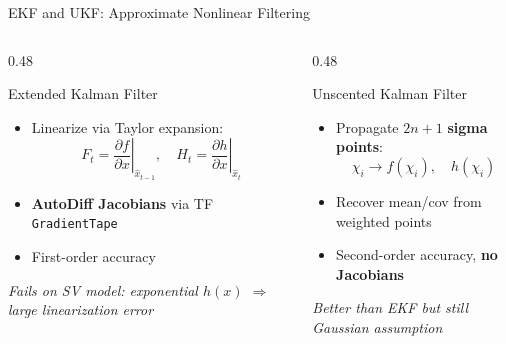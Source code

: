 \documentclass[aspectratio=169,10pt]{beamer}
\newcommand{\highlight}[1]{\textcolor{jpmlightblue}{\textbf{#1}}}
\newcommand{\remark}[1]{\textcolor{jpmaccent}{\textit{#1}}}
\begin{document}
\begin{frame}{EKF and UKF: Approximate Nonlinear Filtering}
\begin{columns}[T]
\begin{column}{0.48\textwidth}
\begin{block}{Extended Kalman Filter}
\begin{itemize}
  \item Linearize via Taylor expansion:
    \[
      F_t = \left.\frac{\partial f}{\partial x}\right|_{\hat{x}_{t-1}}, \quad
      H_t = \left.\frac{\partial h}{\partial x}\right|_{\hat{x}_t}
    \]
  \item \highlight{AutoDiff Jacobians} via TF \texttt{GradientTape}
  \item First-order accuracy
\end{itemize}
\end{block}
\remark{Fails on SV model: exponential $h(x)$ $\Rightarrow$ large linearization error}
\end{column}
\begin{column}{0.48\textwidth}
\begin{block}{Unscented Kalman Filter}
\begin{itemize}
  \item Propagate $2n+1$ \highlight{sigma points}:
    \[
      \chi_i \to f(\chi_i), \quad h(\chi_i)
    \]
  \item Recover mean/cov from weighted points
  \item Second-order accuracy, \textbf{no Jacobians}
\end{itemize}
\end{block}
\remark{Better than EKF but still Gaussian assumption}
\end{column}
\end{columns}
\end{frame}
\end{document}
